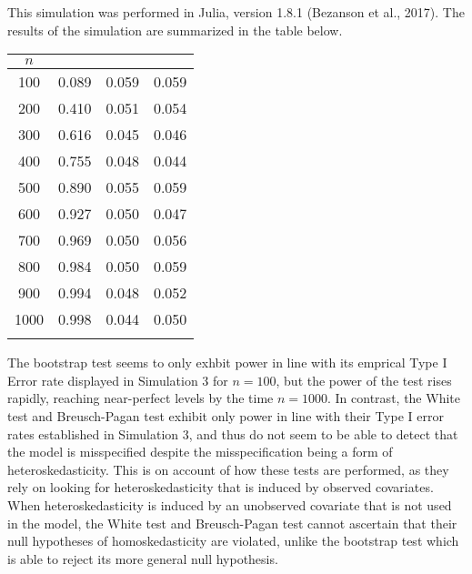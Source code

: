		This simulation was performed in Julia, version 1.8.1 (Bezanson et al., 2017). The results of the simulation are summarized in the table below.

		\begin{table}[H]
			\centering
			\small\addtolength{\tabcolsep}{-3pt}
			\setlength\extrarowheight{-3pt}
			{
			\begin{tabular}{ c|c|c|c}
			$n$ & \vtop{\hbox{\strut Bootstrap}\hbox{\strut Test}} & \vtop{\hbox{\strut White}\hbox{\strut Test}} & \vtop{\hbox{\strut Breusch-Pagan} \hbox{\strut Test}} \\
			 \hline
			 100 & 0.089 & 0.059 & 0.059 \\
			 200 & 0.410 & 0.051 & 0.054 \\
			 300 & 0.616 & 0.045 & 0.046 \\
			 400 & 0.755 & 0.048 & 0.044 \\
			 500 & 0.890 & 0.055 & 0.059 \\
			 600 & 0.927 & 0.050 & 0.047 \\
			 700 & 0.969 & 0.050 & 0.056 \\
			 800 & 0.984 & 0.050 & 0.059 \\
			 900 & 0.994 & 0.048 & 0.052 \\
			 1000 & 0.998 & 0.044 & 0.050 \\
			 
			 \Xhline{3\arrayrulewidth}
			\end{tabular}
			}
		\end{table}

		The bootstrap test seems to only exhbit power in line with its emprical Type I Error rate displayed in Simulation 3 for $n = 100$, but the power of the test rises
		rapidly, reaching near-perfect levels by the time $n = 1000$. In contrast, the White test and Breusch-Pagan test exhibit only power in line with their Type I error
		rates established in Simulation 3, and thus do not seem to be able to detect that the model is misspecified despite the misspecification being a form of
		heteroskedasticity. This is on account of how these tests are performed, as they rely on looking for heteroskedasticity that is induced by observed covariates.
		When heteroskedasticity is induced by an unobserved covariate that is not used in the model, the White test and Breusch-Pagan test cannot ascertain that their
		null hypotheses of homoskedasticity are violated, unlike the bootstrap test which is able to reject its more general null hypothesis.


